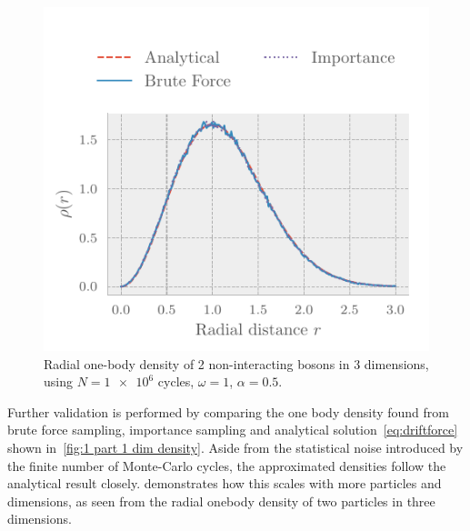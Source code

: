 \begin{figure}[ht]
  \includegraphics[]{figures/density2.pdf}
  \caption{Radial one-body density of 2 non-interacting bosons in 3 dimensions, using $N = \num{1e6}$ cycles, $\omega = 1$, $\alpha = 0.5$.}
  \label{fig:2 part 3 dim density}
\end{figure}


Further validation is performed by comparing the one body density found from
brute force sampling, importance sampling and analytical solution~\cref{eq:driftforce}
shown in~\vref{fig:1 part 1 dim density}. Aside from the statistical noise
introduced by the finite number of Monte-Carlo cycles, the approximated
densities follow the analytical result closely.  demonstrates how this scales with more particles and dimensions,
as seen from the radial onebody density of two particles in three dimensions.

